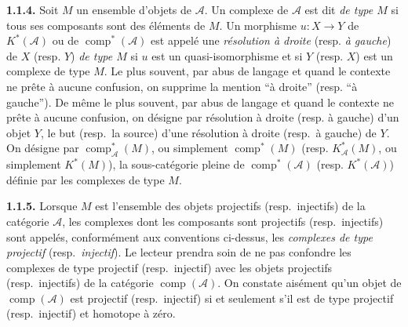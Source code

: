 \medskip\noindent\textbf{1.1.4.}\quad
Soit $M$ un ensemble d'objets de $\mathcal A$. Un complexe de $\mathcal A$
est dit \emph{de type $M$} si tous ses composants sont des éléments de $M$.
Un morphisme $u\colon X\longrightarrow Y$ de $K^{*}(\mathcal A)$ ou de
$\operatorname{comp}^{*}(\mathcal A)$ est appelé une \emph{résolution à
droite} (resp. \emph{à gauche}) de $X$ (resp. $Y$) \emph{de type $M$} si
$u$ est un quasi-isomorphisme et si $Y$ (resp. $X$) est un complexe de type
$M$. Le plus souvent, par abus de langage et quand le contexte ne prête à
aucune confusion, on supprime la mention ``à droite'' (resp. ``à gauche'').
De même le plus souvent, par abus de langage et quand le contexte ne prête
à aucune confusion, on désigne par résolution à droite (resp. à gauche)
d'un objet $Y$, le but (resp.\ la source) d'une résolution à droite (resp.\ à
gauche) de $Y$. On désigne par
$\operatorname{comp}_{\mathcal A}^{*}(M)$, ou simplement
$\operatorname{comp}^{*}(M)$ (resp. $K_{\mathcal A}^{*}(M)$, ou simplement
$K^{*}(M)$), la sous-catégorie pleine de
$\operatorname{comp}^{*}(\mathcal A)$ (resp. $K^{*}(\mathcal A)$) définie
par les complexes de type $M$.

\medskip\noindent\textbf{1.1.5.}\quad
Lorsque $M$ est l'ensemble des objets projectifs (resp.\ injectifs) de la
catégorie $\mathcal A$, les complexes dont les composants sont projectifs
(resp.\ injectifs) sont appelés, conformément aux conventions ci-dessus, les
\emph{complexes de type projectif} (resp.\ \emph{injectif}). Le lecteur
prendra soin de ne pas confondre les complexes de type projectif (resp.\
injectif) avec les objets projectifs (resp.\ injectifs) de la catégorie
$\operatorname{comp}(\mathcal A)$. On constate aisément qu'un objet de
$\operatorname{comp}(\mathcal A)$ est projectif (resp.\ injectif) si et
seulement s'il est de type projectif (resp.\ injectif) et homotope à zéro.
\endgroup

